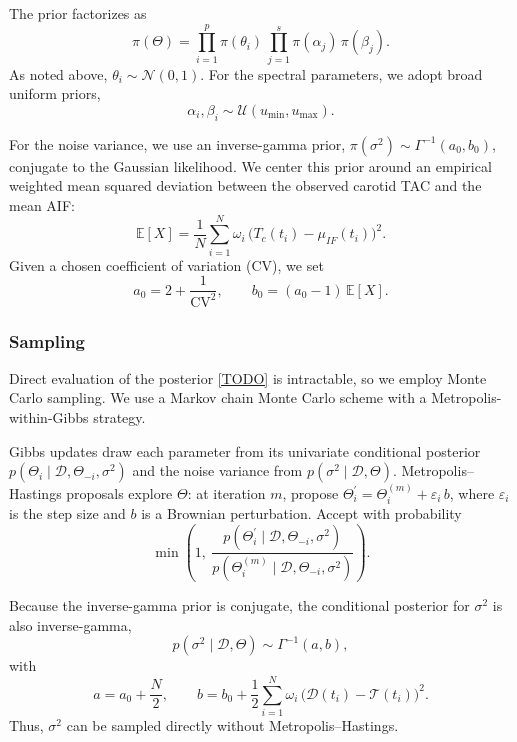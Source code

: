 The prior factorizes as
\begin{equation}
	\pi(\Theta) = \prod_{i=1}^p \pi(\theta_i)\,\prod_{j=1}^s \pi(\alpha_j)\,\pi(\beta_j).
\end{equation}
As noted above, \(\theta_i \sim \mathcal{N}(0,1)\).
For the spectral parameters, we adopt broad uniform priors,
\begin{equation}
	\alpha_i,\beta_i \sim \mathcal{U}( u_{\text{min}} , u_{\text{max}} ).
\end{equation}

For the noise variance, we use an inverse-gamma prior, \(\pi(\sigma^2) \sim \Gamma^{-1}(a_0,b_0)\), conjugate to the Gaussian likelihood.
We center this prior around an empirical weighted mean squared deviation between the observed carotid TAC and the mean AIF:
\begin{equation}
	\mathbb{E}[X] = \frac{1}{N} \sum_{i=1}^{N} \omega_i\,\bigl(T_c(t_i) - \mu_{IF}(t_i)\bigr)^2.
\end{equation}
Given a chosen coefficient of variation (CV), we set
\begin{equation}
	a_0 = 2 + \frac{1}{\mathrm{CV}^2}, \qquad b_0 = (a_0 - 1)\,\mathbb{E}[X].
\end{equation}

\subsubsection{Sampling}
Direct evaluation of the posterior \ref{TODO} is intractable, so we employ Monte Carlo sampling.
We use a Markov chain Monte Carlo scheme with a Metropolis-within-Gibbs strategy.

Gibbs updates draw each parameter from its univariate conditional posterior \(p(\Theta_i \mid \mathcal{D}, \Theta_{-i}, \sigma^2)\) and the noise variance from \(p(\sigma^2 \mid \mathcal{D},\Theta)\).
Metropolis–Hastings proposals explore \(\Theta\): at iteration \(m\), propose \(\Theta_{i}^\prime = \Theta_{i}^{(m)} + \varepsilon_{i}\,b\), where \(\varepsilon_i\) is the step size and \(b\) is a Brownian perturbation.
Accept with probability
\begin{equation}
	\min\!\left(1,\ \frac{p(\Theta_i^\prime \mid \mathcal{D}, \Theta_{-i}, \sigma^2)}{p(\Theta_i^{(m)} \mid \mathcal{D}, \Theta_{-i}, \sigma^2)}\right).
\end{equation}

Because the inverse-gamma prior is conjugate, the conditional posterior for \(\sigma^2\) is also inverse-gamma,
\begin{equation}
	p(\sigma^2 \mid \mathcal{D},\Theta) \sim \Gamma^{-1}(a, b),
\end{equation}
with
\begin{equation}
	a = a_0 + \frac{N}{2}, \qquad b = b_0 + \frac{1}{2}\sum_{i=1}^{N} \omega_i\,\bigl(\mathcal{D}(t_i) - \mathcal{T}(t_i)\bigr)^2.
\end{equation}
Thus, \(\sigma^2\) can be sampled directly without Metropolis–Hastings.

